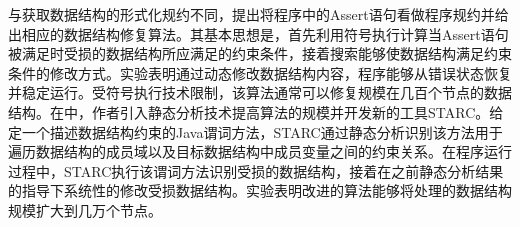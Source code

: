 与获取数据结构的形式化规约不同，\cite{Elkarablieh:2007:ARC:1321631.1321643}提出将程序中的Assert语句看做程序规约并给出相应的数据结构修复算法。其基本思想是，首先利用符号执行计算当Assert语句被满足时受损的数据结构所应满足的约束条件，接着搜索能够使数据结构满足约束条件的修改方式。实验表明通过动态修改数据结构内容，程序能够从错误状态恢复并稳定运行。受符号执行技术限制，该算法通常可以修复规模在几百个节点的数据结构。在\cite{Elkarablieh:2007:SSA:1297105.1297056}中，作者引入静态分析技术提高算法的规模并开发新的工具STARC。给定一个描述数据结构约束的Java谓词方法，STARC通过静态分析识别该方法用于遍历数据结构的成员域以及目标数据结构中成员变量之间的约束关系。在程序运行过程中，STARC执行该谓词方法识别受损的数据结构，接着在之前静态分析结果的指导下系统性的修改受损数据结构。实验表明改进的算法能够将处理的数据结构规模扩大到几万个节点。





